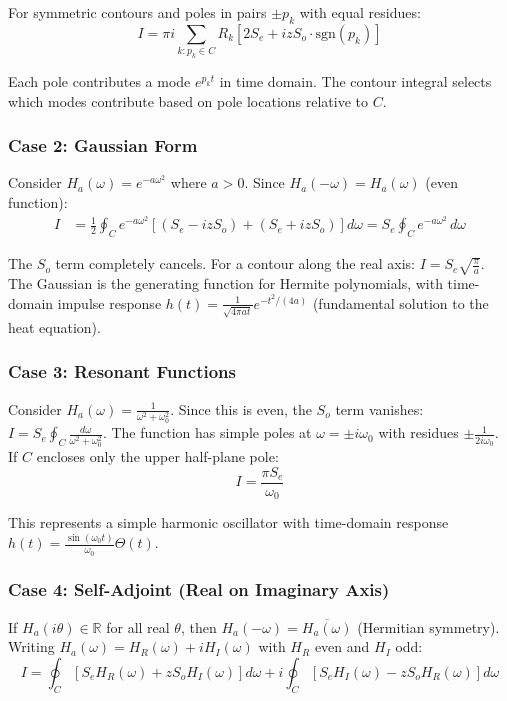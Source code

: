 For symmetric contours and poles in pairs $\pm p_k$ with equal residues:
\[
\boxed{I = \pi i \sum_{k: p_k \in C} R_k \left[2S_e + iz S_o \cdot \text{sgn}(p_k)\right]}
\]

Each pole contributes a mode $e^{p_k t}$ in time domain. The contour integral selects which modes contribute based on pole locations relative to $C$.

\subsubsection{Case 2: Gaussian Form}\label{app:case-gaussian}

Consider $H_a(\omega) = e^{-a\omega^2}$ where $a > 0$. Since $H_a(-\omega) = H_a(\omega)$ (even function):
\begin{align*}
I &= \frac{1}{2}\oint_C e^{-a\omega^2} \left[(S_e - izS_o) + (S_e + izS_o)\right] d\omega = S_e \oint_C e^{-a\omega^2} \, d\omega
\end{align*}

The $S_o$ term completely cancels. For a contour along the real axis: $I = S_e \sqrt{\frac{\pi}{a}}$. The Gaussian is the generating function for Hermite polynomials, with time-domain impulse response $h(t) = \frac{1}{\sqrt{4\pi at}} e^{-t^2/(4a)}$ (fundamental solution to the heat equation).

\subsubsection{Case 3: Resonant Functions}\label{app:case-resonant}

Consider $H_a(\omega) = \frac{1}{\omega^2 + \omega_0^2}$. Since this is even, the $S_o$ term vanishes: $I = S_e \oint_C \frac{d\omega}{\omega^2 + \omega_0^2}$. The function has simple poles at $\omega = \pm i\omega_0$ with residues $\pm \frac{1}{2i\omega_0}$. If $C$ encloses only the upper half-plane pole:
\[
I = \frac{\pi S_e}{\omega_0}
\]

This represents a simple harmonic oscillator with time-domain response $h(t) = \frac{\sin(\omega_0 t)}{\omega_0} \Theta(t)$.

\subsubsection{Case 4: Self-Adjoint (Real on Imaginary Axis)}\label{app:case-self-adjoint}

If $H_a(i\theta) \in \mathbb{R}$ for all real $\theta$, then $H_a(-\omega) = \overline{H_a(\omega)}$ (Hermitian symmetry). Writing $H_a(\omega) = H_R(\omega) + iH_I(\omega)$ with $H_R$ even and $H_I$ odd:
\[
I = \oint_C \left[S_e H_R(\omega) + z S_o H_I(\omega)\right] d\omega + i\oint_C \left[S_e H_I(\omega) - z S_o H_R(\omega)\right] d\omega
\]


